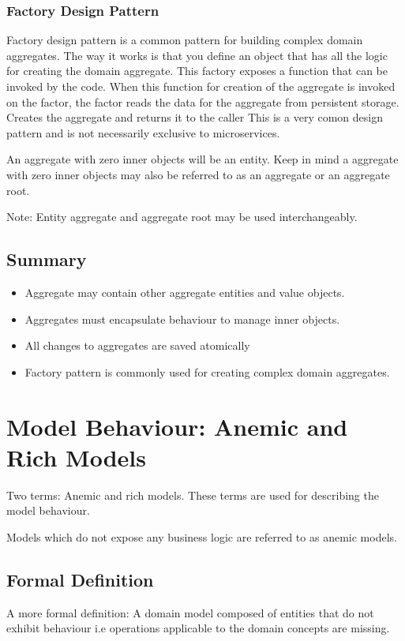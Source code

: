 \subsubsection{Factory Design Pattern}
Factory design pattern is a common pattern for building complex domain aggregates.
The way it works is that you define an object that has all the logic for creating the domain aggregate.
This factory exposes a function that can be invoked by the code.
When this function for creation of the aggregate is invoked on the factor, the factor reads the data for the aggregate from persistent storage.
Creates the aggregate and returns it to the caller
This is a very comon design pattern and is not necessarily exclusive to microservices.

An aggregate with zero inner objects will be an entity.
Keep in mind a aggregate with zero inner objects may also be referred to as an aggregate or an aggregate root.

\begin{note}
    Note: Entity aggregate and aggregate root may be used interchangeably.
\end{note}

\subsection{Summary}
\begin{itemize}
    \item Aggregate may contain other aggregate entities and value objects.
    \item Aggregates must encapsulate behaviour to manage inner objects.
    \item All changes to aggregates are saved atomically
    \item Factory pattern is commonly used for creating complex domain aggregates.
\end{itemize}


\section{Model Behaviour: Anemic and Rich Models}

Two terms: Anemic and rich models.
These terms are used for describing the model behaviour.

Models which do not expose any business logic are referred to as anemic models.

\subsection{Formal Definition}
A more formal definition:
A domain model composed of entities that do not exhibit behaviour i.e operations applicable to the domain concepts are missing.

